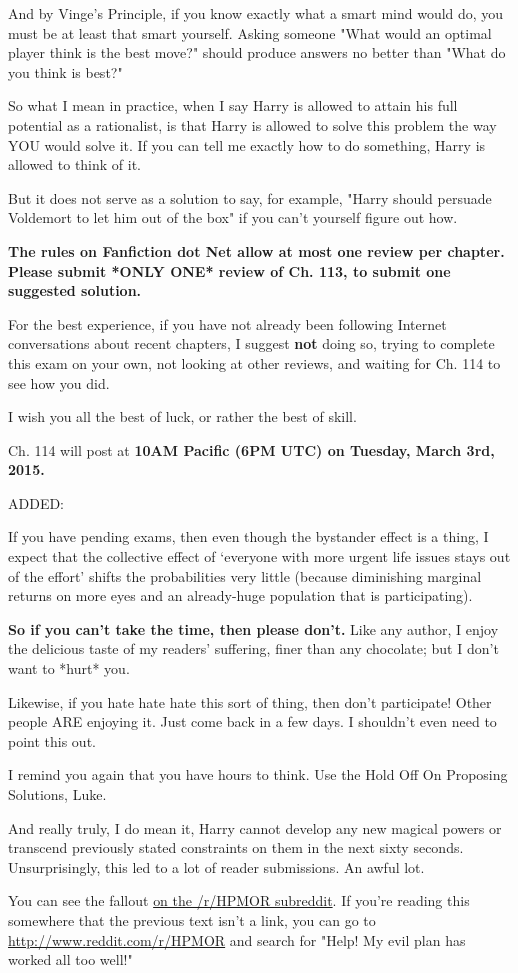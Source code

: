 {And by Vinge's Principle,
if you know exactly what a smart mind would do,
you must be at least that smart yourself.
Asking someone "What would an optimal player think is the best move?"
should produce answers no better than "What do you think is best?"

So what I mean in practice,
when I say Harry is allowed to attain his full potential as a
rationalist,
is that Harry is allowed to solve this problem
the way YOU would solve it.
If you can tell me exactly how to do something,
Harry is allowed to think of it.

But it does not serve as a solution to say, for example,
"Harry should persuade Voldemort to let him out of the box"
if you can't yourself figure out how.

\textbf{The rules on Fanfiction dot Net allow at most one review per
chapter.
Please submit *ONLY ONE* review of Ch. 113,
to submit one suggested solution.}

For the best experience, if you have not already been following
Internet conversations about recent chapters, I suggest
\textbf{not} doing so,
trying to complete this exam on your own,
not looking at other reviews,
and waiting for Ch. 114 to see how you did.

I wish you all the best of luck, or rather the best of skill.

Ch. 114 will post at \textbf{10AM Pacific (6PM UTC) on Tuesday, March
3rd, 2015.}

ADDED:

If you have pending exams,
then even though the bystander effect is a thing,
I expect that the collective effect of
`everyone with more urgent life issues stays out of the effort'
shifts the probabilities very little
(because diminishing marginal returns on more eyes
and an already-huge population that is participating).

\textbf{So if you can't take the time, then please don't.}
Like any author, I enjoy the delicious taste of my readers' suffering,
finer than any chocolate; but I don't want to *hurt* you.

Likewise, if you hate hate hate this sort of thing, then don't
participate!
Other people ARE enjoying it. Just come back in a few days.
I shouldn't even need to point this out.

I remind you again that you have hours to think.
Use the Hold Off On Proposing Solutions, Luke.

And really truly, I do mean it,
Harry cannot develop any new magical powers
or transcend previously stated constraints on them
in the next sixty seconds.
\later
Unsurprisingly, this led to a lot of reader submissions. An awful lot.

You can see the
fallout \href{http://www.reddit.com/r/HPMOR/comments/2xnyi0/113_help_my_evil_plan_has_worked_all_too_well/}{on the /r/HPMOR subreddit}. 
If you're reading this somewhere that the previous text isn't a link, you 
can go to \url{http://www.reddit.com/r/HPMOR} and search for "Help! My evil plan has worked all too well!"
}